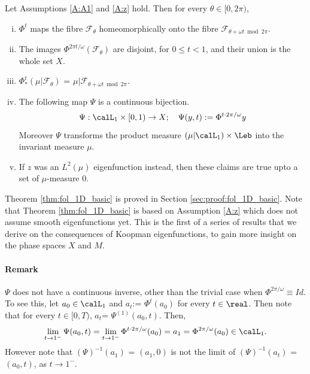 \documentclass[12pt,oneside]{article}
\newcommand{\Fol}{\mathcal{F}}
\newcommand{\Iso}{\Psi}
\begin{document}
\begin{theorem}\label{thm:fol_1D_basic}
Let Assumptions \ref{A:A1} and \ref{A:z} hold. Then for every $\theta\in [0,2\pi)$,
\begin{enumerate}[(i)]
	\item $\Phi^t$ maps the fibre $\Fol_\theta$ homeomorphically onto the fibre $\Fol_{\theta+\omega t \bmod 2\pi}$. 
	\item The images $\Phi^{2\pi t/\omega}(\Fol_\theta)$ are disjoint, for $0\leq t<1$, and their union is the whole set $X$.
	\item $\Phi^t_{*}\left(\mu|\Fol_{\theta}\right)$ = $\mu|\Fol_{\theta+\omega t \bmod 2\pi}$.
	\item The following map $\Iso$ is a continuous bijection.
	\begin{equation}\label{eqn:def:Iso1}	
	\Iso : \calL_1 \times [0,1)\to X; \quad \Iso(y,t) := \Phi^{t \cdot 2\pi/\omega} y
	\end{equation}
	Moreover $\Iso$ transforms the product measure $\left(\mu | \calL_1\right)\times \Leb$ into the invariant measure $\mu$. 
	\item If $z$ was an $L^2(\mu)$ eigenfunction instead, then these claims are true upto a set of $\mu$-measure $0$.
\end{enumerate}
\end{theorem} 

Theorem \ref{thm:fol_1D_basic} is proved in Section \ref{sec:proof:fol_1D_basic}. Note that Theorem \ref{thm:fol_1D_basic} is based on Assumption \ref{A:z}
which does not assume smooth eigenfunctions yet.  This is the first of a series of results that we derive on the consequences of Koopman eigenfunctions, to gain more insight on the phase spaces $X$ and $M$. 

\paragraph{Remark} $\Iso$ does not have a continuous inverse, other than the trivial case when $\Phi^{2\pi/\omega} \equiv Id$. To see this, let $a_0 \in \calL_1$ and $a_t$:= $\Phi^t(a_0)$ for every $t\in\real$. Then note that for every $t\in [0,T)$, $a_t$= $\Iso^{(1)}(a_0,t)$. Then, 
%
\[ \lim_{t\to 1^{-}} \Iso(a_0,t) = \lim_{t\to 1^{-}} \Phi^{t\cdot 2\pi/\omega}(a_0) = a_1 = \Phi^{2\pi/\omega}(a_0)\in \calL_1.\]
%
However note that $\left(\Iso\right)^{-1}(a_1)$ = $(a_1,0)$ is not the limit of $\left(\Iso\right)^{-1}(a_t)$ = $(a_0,t)$, as $t\to 1^{-}$.
\end{document}
